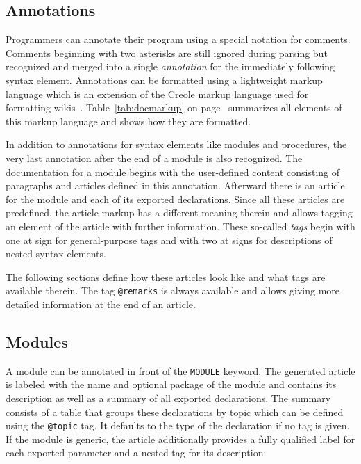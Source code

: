 \subsection{Annotations}

Programmers can annotate their program using a special notation for comments.
Comments beginning with two asterisks are still ignored during parsing but recognized and merged into a single \emph{annotation} for the immediately following syntax element.
Annotations can be formatted using a lightweight markup language which is an extension of the Creole markup language used for formatting wikis~\cite{sauer2007}.
Table~\ref{tab:docmarkup} \ifbook on page~\pageref{tab:docmarkup} \fi summarizes all elements of this markup language and shows how they are formatted.
\seedocumentation

\ifbook\else\markuptable\fi

In addition to annotations for syntax elements like modules and procedures, the very last annotation after the end of a module is also recognized.
The documentation for a module begins with the user-defined content consisting of paragraphs and articles defined in this annotation.
Afterward there is an article for the module and each of its exported declarations.
Since all these articles are predefined, the article markup has a different meaning therein and allows tagging an element of the article with further information.
These so-called \emph{tags} begin with one at sign for general-purpose tags and with two at signs for descriptions of nested syntax elements.

The following sections define how these articles look like and what tags are available therein.
The tag \texttt{@remarks} is always available and allows giving more detailed information at the end of an article.

\subsection{Modules}

A module can be annotated in front of the \texttt{MODULE} keyword.
The generated article is labeled with the name and optional package of the module and contains its description as well as a summary of all exported declarations.
The summary consists of a table that groups these declarations by topic which can be defined using the \texttt{@topic} tag.
It defaults to the type of the declaration if no tag is given.
If the module is generic, the article additionally provides a fully qualified label for each exported parameter and a nested tag for its description:

